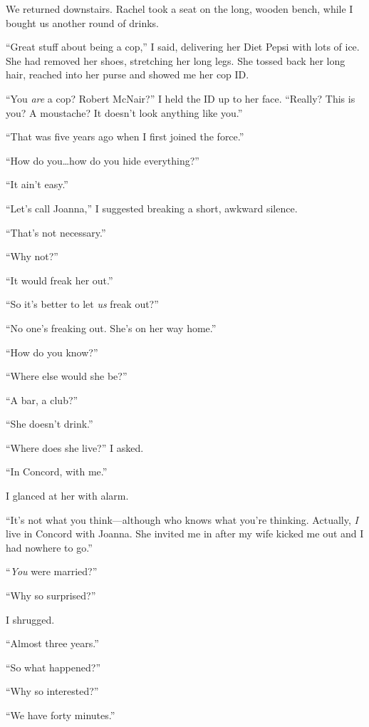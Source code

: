 We returned downstairs. Rachel took a seat on the long, wooden bench,
while I bought us another round of drinks.

``Great stuff about being a cop,'' I said, delivering her Diet Pepsi
with lots of ice. She had removed her shoes, stretching her long legs.
She tossed back her long hair, reached into her purse and showed me her
cop ID.

``You \emph{are} a cop? Robert McNair?'' I held the ID up to her face.
``Really? This is you? A moustache? It doesn't look anything like you.''

``That was five years ago when I first joined the force.''

``How do you\ldots how do you hide everything?''

``It ain't easy.''

``Let's call Joanna,'' I suggested breaking a short, awkward silence.

``That's not necessary.''

``Why not?''

``It would freak her out.''

``So it's better to let \emph{us} freak out?''

``No one's freaking out. She's on her way home.''

``How do you know?''

``Where else would she be?''

``A bar, a club?''

``She doesn't drink.''

``Where does she live?'' I asked.

``In Concord, with me.''

I glanced at her with alarm.

``It's not what you think---although who knows what you're thinking.
Actually, \emph{I} live in Concord with Joanna. She invited me in after
my wife kicked me out and I had nowhere to go.''

``\emph{You} were married?''

``Why so surprised?''

I shrugged.

``Almost three years.''

``So what happened?''

``Why so interested?''

``We have forty minutes.''

